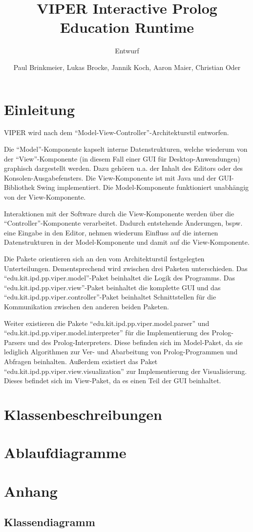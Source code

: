 \documentclass[parskip=full,11pt,twoside]{scrartcl}
\title{VIPER Interactive Prolog Education Runtime}
\subtitle{Entwurf}
\author{Paul Brinkmeier, Lukas Brocke, Jannik Koch, Aaron Maier, Christian Oder}
\begin{document}
\maketitle

\section{Einleitung}

VIPER wird nach dem \enquote{Model-View-Controller}-Architekturstil entworfen.

Die \enquote{Model}-Komponente kapselt interne Datenstrukturen, welche wiederum von der \enquote{View}-Komponente (in diesem Fall einer GUI für Desktop-Anwendungen) graphisch dargestellt werden. Dazu gehören u.a. der Inhalt des Editors oder des Konsolen-Ausgabefensters. Die View-Komponente ist mit Java und der GUI-Bibliothek Swing implementiert. Die Model-Komponente funktioniert unabhängig von der View-Komponente.

Interaktionen mit der Software durch die View-Komponente werden über die \enquote{Controller}-Komponente verarbeitet. Dadurch entstehende Änderungen, bspw. eine Eingabe in den Editor, nehmen wiederum Einfluss auf die internen Datenstrukturen in der Model-Komponente und damit auf die View-Komponente.

Die Pakete orientieren sich an den vom Architekturstil festgelegten Unterteilungen. Dementsprechend wird zwischen drei Paketen unterschieden. Das \enquote{edu.kit.ipd.pp.viper.model}-Paket beinhaltet die Logik des Programms. Das \enquote{edu.kit.ipd.pp.viper.view}-Paket beinhaltet die komplette GUI und das \enquote{edu.kit.ipd.pp.viper.controller}-Paket beinhaltet Schnittstellen für die Kommunikation zwischen den anderen beiden Paketen.

Weiter existieren die Pakete \enquote{edu.kit.ipd.pp.viper.model.parser} und \enquote{edu.kit.ipd.pp.viper.model.interpreter} für die Implementierung des Prolog-Parsers und des Prolog-Interpreters. Diese befinden sich im Model-Paket, da sie lediglich Algorithmen zur Ver- und Abarbeitung von Prolog-Programmen und Abfragen beinhalten.
Außerdem existiert das Paket \enquote{edu.kit.ipd.pp.viper.view.visualization} zur Implementierung der Visualisierung. Dieses befindet sich im View-Paket, da es einen Teil der GUI beinhaltet. 

\section{Klassenbeschreibungen}

\section{Ablaufdiagramme}

\appendix

\section{Anhang}

\subsection{Klassendiagramm}
\end{document}
